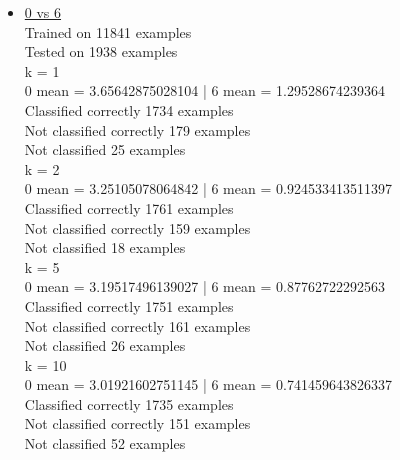 \documentclass[11pt]{article}
\theoremstyle{definition}
\theoremstyle{definition}
\begin{document}
\begin{itemize}
	\item
		\underline{0 vs 6}\\
Trained on 11841 examples\\
Tested on  1938 examples\\
k = 1\\
0 mean = 3.65642875028104 | 6 mean = 1.29528674239364\\
Classified correctly 1734 examples\\
Not classified correctly 179 examples\\
Not classified 25 examples\\
k = 2\\
0 mean = 3.25105078064842 | 6 mean = 0.924533413511397\\
Classified correctly 1761 examples\\
Not classified correctly 159 examples\\
Not classified 18 examples\\
k = 5\\
0 mean = 3.19517496139027 | 6 mean = 0.87762722292563\\
Classified correctly 1751 examples\\
Not classified correctly 161 examples\\
Not classified 26 examples\\
k = 10\\
0 mean = 3.01921602751145 | 6 mean = 0.741459643826337\\
Classified correctly 1735 examples\\
Not classified correctly 151 examples\\
Not classified 52 examples


\end{itemize}
\end{document}
